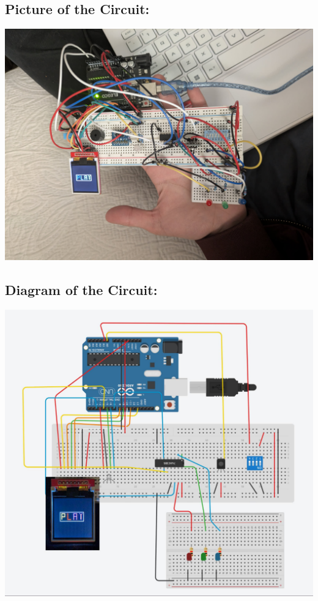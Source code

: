 \documentclass[12pt]{article}
\begin{document}
\subsection*{Picture of the Circuit:}
    \includegraphics[width=\textwidth]{CircuitPic.jpeg}

\subsection*{Diagram of the Circuit:}
    \includegraphics[width=\textwidth]{CircuitDiagram.jpg}
\end{document}
